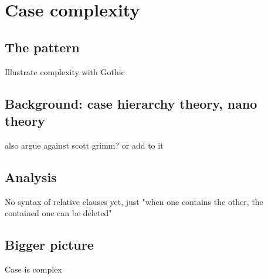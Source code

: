 
\chapter{Case complexity}

  \section{The pattern}

Illustrate complexity with Gothic


  \section{Background: case hierarchy theory, nano theory}

also argue against scott grimm? or add to it


  \section{Analysis}

No syntax of relative clauses yet, just "when one contains the other, the contained one can be deleted"


  \section{Bigger picture}

Case is complex
